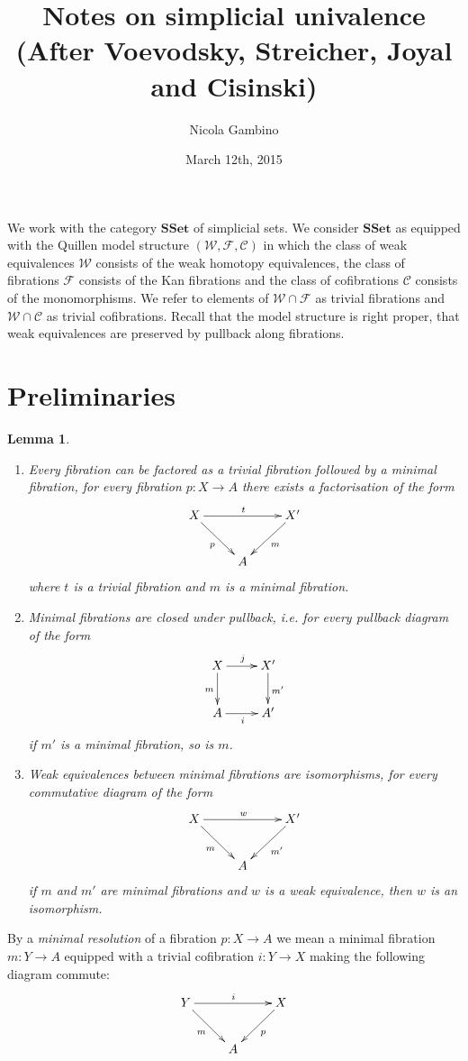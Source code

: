 \documentclass[reqno,10pt,a4paper,oneside]{amsart}
\author[]{Nicola Gambino}
\title[Simplicial univalence]{Notes on simplicial univalence \\ (After Voevodsky, Streicher, Joyal and Cisinski)}
\date{March 12th, 2015}
\newcommand{\ie}{\text{i.e.\ }}
\newtheorem{lemma}[theorem]{Lemma}
\theoremstyle{definition}
\newcommand{\co}{\colon}
\newcommand{\SSet}{\mathbf{SSet}}
\begin{document}
\maketitle


We work with the category $\SSet$ of simplicial sets. We consider $\SSet$ as equipped with the Quillen model structure $(\mathcal{W},
\mathcal{F}, \mathcal{C})$ in which the class of weak equivalences  $\mathcal{W}$ consists of the weak homotopy equivalences, the class of fibrations $\mathcal{F}$ consists of the Kan
fibrations and the class of cofibrations $\mathcal{C}$ consists of the monomorphisms. We refer to
elements of $\mathcal{W} \cap \mathcal{F}$ as trivial fibrations and $\mathcal{W} \cap \mathcal{C}$
as trivial cofibrations. Recall that the model structure is right proper, \ie that weak equivalences are
preserved by pullback along fibrations.


\section{Preliminaries}


\begin{lemma} \label{thm:minfib} \hfill 
\begin{enumerate}[$(i)$]
\item Every fibration can be factored as a trivial fibration followed by a minimal fibration, \ie 
for every fibration $p \co X \to A$ there exists a factorisation of the form
\[
\xymatrix{
X \ar[rr]^{t} \ar[dr]_p & & X' \ar[dl]^{m} \\
 & A & }
 \]
 where $t$ is a trivial fibration and $m$ is a minimal fibration.
 \item Minimal fibrations are closed under pullback, i.e. for every pullback diagram of the
 form
 \[
 \xymatrix{
 X \ar[r]^j \ar[d]_{m} & X' \ar[d]^{m'} \\
 A \ar[r]_i  & A' }
 \]
 if $m'$ is a minimal fibration, so is $m$.
 \item Weak equivalences between minimal fibrations are isomorphisms, \ie for every 
 commutative diagram of the form
 \[
\xymatrix{
X \ar[rr]^{w} \ar[dr]_m & & X' \ar[dl]^{m'} \\
 & A & }
 \]
if $m$ and $m'$ are minimal fibrations and $w$ is a weak equivalence, then $w$ 
is an isomorphism.
\end{enumerate}
\end{lemma}

By a \emph{minimal resolution} of a fibration $p \co X \to A$ we mean a minimal fibration $m \co Y
\to A$ equipped with a trivial cofibration $i \co Y \to X$ making the following diagram commute:
\[
\xymatrix{
Y \ar[rr]^{i} \ar[dr]_{m} & & X \ar[dl]^{p} \\
 & A & }
 \]
 
\end{document}
